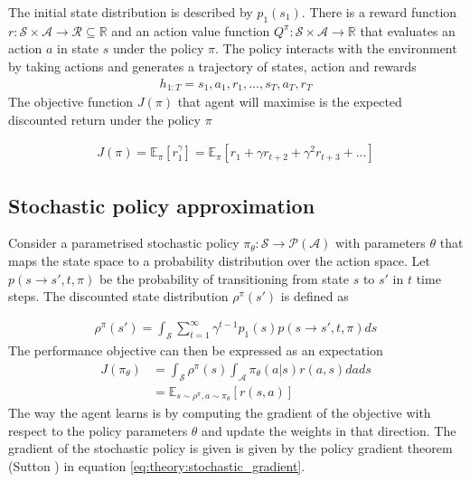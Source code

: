 \documentclass[class=book, crop=false]{standalone}
\begin{document}
The initial state distribution is described by $p_{1}(s_{1})$. There is a reward function $r: \mathcal{S} \times \mathcal{A} \to \mathcal{R} \subseteq \mathbb{R}$ and an action value function $Q^{\pi}:\mathcal{S} \times \mathcal{A} \to \mathbb{R}$ that evaluates an action $a$ in state $s$ under the policy $\pi$. The policy interacts with the environment by taking actions and generates a trajectory of states, action and rewards 
\begin{equation}
   \begin{aligned}\label{eq:theory:trajectory2}
h_{1:T} = s_{1},a_{1},r_{1},..., s_{T},a_{T},r_{T}
\end{aligned} 
\end{equation}
The objective function $J(\pi)$ that agent will maximise is the expected discounted return under the policy $\pi$

\begin{equation}
   \begin{aligned}\label{eq:theory:max_discounted_return}
J(\pi)
= \mathbb{E}_{\pi}[r^{\gamma}_{1}]
= \mathbb{E}_{\pi}[ r_{1} + \gamma r_{t+2} + \gamma^{2} r_{t+3} + ...]
\end{aligned} 
\end{equation}

\subsection{Stochastic policy approximation}\label{section:stochastic_policy_approx}
Consider a parametrised stochastic policy $\pi_{\theta}: \mathcal{S}\to \mathcal{P}(\mathcal{A})$ with parameters $\theta$ that maps the state space to a probability distribution over the action space. Let $p(s\to s',t,\pi)$ be the probability of transitioning from state $s$ to $s'$ in $t$ time steps. The discounted state distribution $\rho^{\pi}(s')$ is defined as   

\begin{equation}
   \begin{aligned}\label{eq:theory:discounted_state_distribution}
    \rho^{\pi}(s') = \int_{\mathcal{S}}\sum_{t=1}^{\infty }\gamma^{t-1}p_{1}(s)
    p(s \to s',t,\pi)ds
\end{aligned} 
\end{equation}
The performance objective can then be expressed as an expectation
\begin{equation}
   \begin{aligned}\label{eq:theory:objective_expected_stochastic}
    J(\pi_{\theta}) &= 
    \int_{\mathcal{S}}\rho^{\pi}(s) \int_{\mathcal{A}}\pi_{\theta}(a|s)r(a,s)da ds 
    \\
    &=
    \mathbb{E}_{s\sim \rho^{\pi},a \sim \pi_{\theta}}[r(s,a)]
\end{aligned} 
\end{equation}
 The way the agent learns is by computing the gradient of the objective with respect to the policy parameters $\theta$ and update the weights in that direction. The gradient of the stochastic policy is given is given by the policy gradient theorem (Sutton \cite{Sutton1998}) in equation \eqref{eq:theory:stochastic_gradient}.
\end{document}
